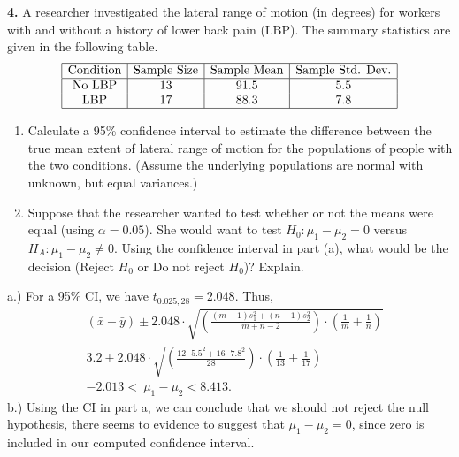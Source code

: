 \documentclass{report}
\begin{document}
 \pagebreak \bigbreak \noindent 
 \begin{mdframed}
     \noindent \textbf{4.} A researcher investigated the lateral range of motion (in degrees) for workers with and without a history of lower back pain (LBP). The summary statistics are given in the following table.
     \[
         \begin{array}{|c|c|c|c|}
             \hline
             \text{Condition} & \text{Sample Size} & \text{Sample Mean} & \text{Sample Std. Dev.} \\
             \hline
             \text{No LBP} & 13 & 91.5 & 5.5 \\
             \text{LBP} & 17 & 88.3 & 7.8 \\
             \hline
         \end{array}
     \]

     \begin{enumerate}[label=(\alph*)]
         \item Calculate a 95\% confidence interval to estimate the difference between the true mean extent of lateral range of motion for the populations of people with the two conditions. (Assume the underlying populations are normal with unknown, but equal variances.)
         \item Suppose that the researcher wanted to test whether or not the means were equal (using $\alpha = 0.05$). She would want to test $H_0: \mu_1 - \mu_2 = 0$ versus $H_A: \mu_1 - \mu_2 \neq 0$. Using the confidence interval in part (a), what would be the decision (Reject $H_0$ or Do not reject $H_0$)? Explain.
     \end{enumerate}

 \end{mdframed}
 \bigbreak \noindent 
    a.) For a 95\% CI, we have $t_{0.025, 28} =2.048$. Thus,
    \begin{align*}
        &(\bar{x} - \bar{y}) \pm 2.048 \cdot \sqrt{\left(\frac{(m-1)s_{1}^{2} + (n-1)s_{2}^{2}}{m+n-2}\right) \cdot  \left(\frac{1}{m} + \frac{1}{n}\right)}  \\
        &3.2 \pm 2.048 \cdot \sqrt{\left(\frac{12 \cdot 5.5^{2} + 16 \cdot 7.8^{2}}{28}\right) \cdot \left(\frac{1}{13} + \frac{1}{17}\right)} \\
        & -2.013 <\ \mu_{1} - \mu_{2} < 8.413
    .\end{align*}
    \bigbreak \noindent 
    b.) Using the CI in part a, we can conclude that we should not reject the null hypothesis, there seems to evidence to suggest that $\mu_{1} - \mu_{2} =0 $, since zero is included in our computed confidence interval.



 
\end{document}

